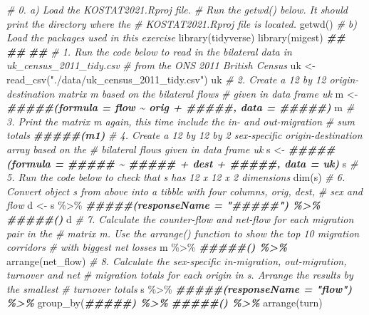 \documentclass[
]{book}
\newenvironment{Shaded}{\begin{snugshade}}{\end{snugshade}}
\newcommand{\CommentTok}[1]{\textcolor[rgb]{0.56,0.35,0.01}{\textit{#1}}}
\newcommand{\DocumentationTok}[1]{\textcolor[rgb]{0.56,0.35,0.01}{\textbf{\textit{#1}}}}
\newcommand{\FunctionTok}[1]{\textcolor[rgb]{0.00,0.00,0.00}{#1}}
\newcommand{\NormalTok}[1]{#1}
\newcommand{\OtherTok}[1]{\textcolor[rgb]{0.56,0.35,0.01}{#1}}
\newcommand{\SpecialCharTok}[1]{\textcolor[rgb]{0.00,0.00,0.00}{#1}}
\newcommand{\StringTok}[1]{\textcolor[rgb]{0.31,0.60,0.02}{#1}}
\begin{document}
\begin{Shaded}
\begin{Highlighting}[]
\CommentTok{\# 0.  a) Load the KOSTAT2021.Rproj file. }
\CommentTok{\#     Run the getwd() below. It should print the directory where the }
\CommentTok{\#     KOSTAT2021.Rproj file is located.}
\FunctionTok{getwd}\NormalTok{()}
\CommentTok{\#     b) Load the packages used in this exercise}
\FunctionTok{library}\NormalTok{(tidyverse)}
\FunctionTok{library}\NormalTok{(migest)}
\DocumentationTok{\#\#}
\DocumentationTok{\#\#}
\DocumentationTok{\#\#}
\CommentTok{\# 1. Run the code below to read in the bilateral data in uk\_census\_2011\_tidy.csv }
\CommentTok{\#    from the ONS 2011 British Census}
\NormalTok{uk }\OtherTok{\textless{}{-}} \FunctionTok{read\_csv}\NormalTok{(}\StringTok{"./data/uk\_census\_2011\_tidy.csv"}\NormalTok{)}
\NormalTok{uk}
\CommentTok{\# 2. Create a 12 by 12 origin{-}destination matrix m based on the bilateral flows}
\CommentTok{\#    given in data frame uk}
\NormalTok{m }\OtherTok{\textless{}{-}} \DocumentationTok{\#\#\#\#\#(formula = flow \textasciitilde{} orig + \#\#\#\#\#, data = \#\#\#\#\#)}
\NormalTok{m}
\CommentTok{\# 3. Print the matrix m again, this time include the in{-} and out{-}migration }
\CommentTok{\#    sum totals}
\DocumentationTok{\#\#\#\#\#(m1)}
\CommentTok{\# 4. Create a 12 by 12 by 2 sex{-}specific origin{-}destination array based on the}
\CommentTok{\#    bilateral flows given in data frame uk}
\NormalTok{s }\OtherTok{\textless{}{-}} \DocumentationTok{\#\#\#\#\#(formula = \#\#\#\#\# \textasciitilde{} \#\#\#\#\# + dest + \#\#\#\#\#, data = uk)}
\NormalTok{s}
\CommentTok{\# 5. Run the code below to check that s has 12 x 12 x 2 dimensions}
\FunctionTok{dim}\NormalTok{(s)}
\CommentTok{\# 6. Convert object s from above into a tibble with four columns, orig, dest, }
\CommentTok{\#    sex and flow}
\NormalTok{d }\OtherTok{\textless{}{-}}\NormalTok{ s }\SpecialCharTok{\%\textgreater{}\%}
  \DocumentationTok{\#\#\#\#\#(responseName = "\#\#\#\#\#") \%\textgreater{}\%}
  \DocumentationTok{\#\#\#\#\#()}
\NormalTok{d}
\CommentTok{\# 7. Calculate the counter{-}flow and net{-}flow for each migration pair in the }
\CommentTok{\#    matrix m. Use the arrange() function to show the top 10 migration corridors}
\CommentTok{\#    with biggest net losses }
\NormalTok{m }\SpecialCharTok{\%\textgreater{}\%}
  \DocumentationTok{\#\#\#\#\#() \%\textgreater{}\%}
  \FunctionTok{arrange}\NormalTok{(net\_flow)}
\CommentTok{\# 8. Calculate the sex{-}specific in{-}migration, out{-}migration, turnover and net }
\CommentTok{\#    migration totals for each origin in s. Arrange the results by the smallest}
\CommentTok{\#    turnover totals}
\NormalTok{s }\SpecialCharTok{\%\textgreater{}\%}
  \DocumentationTok{\#\#\#\#\#(responseName = "flow") \%\textgreater{}\%}
  \FunctionTok{group\_by}\NormalTok{(}\DocumentationTok{\#\#\#\#\#) \%\textgreater{}\%}
  \DocumentationTok{\#\#\#\#\#() \%\textgreater{}\%}
  \FunctionTok{arrange}\NormalTok{(turn)}
\end{Highlighting}
\end{Shaded}
\end{document}
